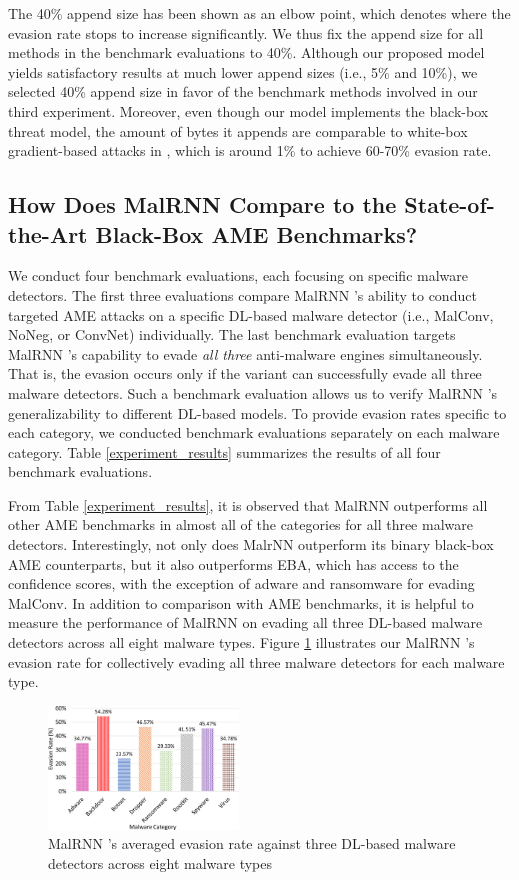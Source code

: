 \documentclass[letterpaper]{article}
\newcommand{\malrnn}{M\lowercase{a}lRNN }
\begin{document}
The 40\% append size has been shown as an elbow point, which denotes where the evasion rate stops to increase significantly. We thus fix the append size for all methods in the benchmark evaluations to 40\%. Although our proposed model yields satisfactory results at much lower append sizes (i.e., 5\% and 10\%), we selected 40\% append size in favor of the benchmark methods involved in our third experiment. Moreover, even though our model implements the black-box threat model, the amount of bytes it appends are comparable to white-box gradient-based attacks in \cite{kolosnjaji2018adversarial}, which is around 1\% to achieve 60-70\% evasion rate.

\subsection{How Does MalRNN Compare to the State-of-the-Art Black-Box AME Benchmarks?}

We conduct four benchmark evaluations, each focusing on specific malware detectors. The first three evaluations compare \malrnn's ability to conduct targeted AME attacks on a specific DL-based malware detector (i.e., MalConv, NoNeg, or ConvNet) individually. The last benchmark evaluation targets \malrnn's capability to evade \textit{all three} anti-malware engines simultaneously. That is, the evasion occurs only if the variant can successfully evade all three malware detectors. Such a benchmark evaluation allows us to verify \malrnn's generalizability to different DL-based models. To provide evasion rates specific to each category, we conducted benchmark evaluations separately on each malware category. Table \ref{experiment_results} summarizes the results of all four benchmark evaluations.

From Table \ref{experiment_results}, it is observed that \malrnn outperforms all other AME benchmarks in almost all of the categories for all three malware detectors. Interestingly, not only does MalrNN outperform its binary black-box AME counterparts, but it also outperforms EBA, which has access to the confidence scores, with the exception of adware and ransomware for evading MalConv. In addition to comparison with AME benchmarks, it is helpful to measure the performance of \malrnn on evading all three DL-based malware detectors across all eight malware types. Figure \ref{experiment_graph} illustrates our \malrnn's evasion rate for collectively evading all three malware detectors for each malware type.


\begin{figure}[h]
    \centering
    \includegraphics[width=0.45\textwidth]{Final_Evasion_Rate_Illustration.png}
    \caption{\malrnn's averaged evasion rate against three DL-based malware detectors across eight malware types}
    \label{experiment_graph}
\end{figure}
\end{document}
